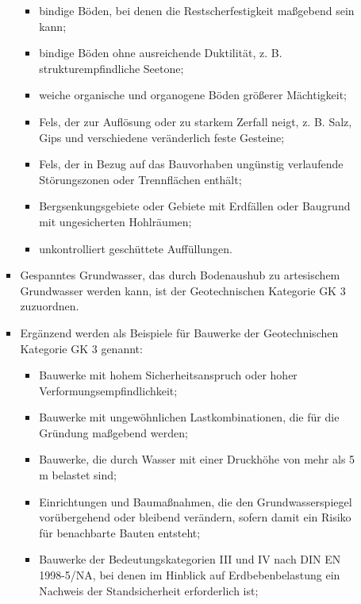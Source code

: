\documentclass[fleqn,twoside]{article}
\begin{document}
\begin{itemize}
\begin{itemize}
\begin{itemize}
\begin{itemize}
                                \item bindige Böden, bei denen die Restscherfestigkeit maßgebend sein kann;
                                \item bindige Böden ohne ausreichende Duktilität, z. B. strukturempfindliche Seetone;
                                \item weiche organische und organogene Böden größerer Mächtigkeit;
                                \item Fels, der zur Auflösung oder zu starkem Zerfall neigt, z. B. Salz, Gips und verschiedene veränderlich feste Gesteine;
                                \item Fels, der in Bezug auf das Bauvorhaben ungünstig verlaufende Störungszonen oder Trennflächen
                                enthält;
                                \item Bergsenkungsgebiete oder Gebiete mit Erdfällen oder Baugrund mit ungesicherten Hohlräumen;
                                \item unkontrolliert geschüttete Auffüllungen.
                            \end{itemize}
                        \item Gespanntes Grundwasser, das durch Bodenaushub zu artesischem Grundwasser werden kann, ist der              Geotechnischen Kategorie GK 3 zuzuordnen.
                        \item Ergänzend werden als Beispiele für Bauwerke der Geotechnischen Kategorie GK 3 genannt:
                            \begin{itemize}
                                \item Bauwerke mit hohem Sicherheitsanspruch oder hoher Verformungsempfindlichkeit;
                                \item Bauwerke mit ungewöhnlichen Lastkombinationen, die für die Gründung maßgebend werden;
                                \item Bauwerke, die durch Wasser mit einer Druckhöhe von mehr als 5 m belastet sind;
                                \item Einrichtungen und Baumaßnahmen, die den Grundwasserspiegel vorübergehend oder bleibend                verändern, sofern damit ein Risiko für benachbarte Bauten entsteht;
                                \item Bauwerke der Bedeutungskategorien III und IV nach DIN EN 1998-5/NA, bei denen im Hinblick auf                Erdbebenbelastung ein Nachweis der Standsicherheit erforderlich ist;

\end{itemize}
\end{itemize}
\end{itemize}
\end{itemize}
\end{document}
